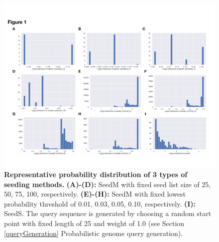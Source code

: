 \documentclass[12pt]{article}
\begin{document}
	\begin{figure}[!htb]
		\centering
		\includegraphics[width=1\textwidth,trim={0.5cm 1cm 0.7cm 3cm},clip]{fig1} %
		\caption{\textbf{Representative probability distribution of 3 types of seeding methods.} \textbf{(A)-(D):} SeedM with fixed seed list size of 25, 50, 75, 100, respectively. \textbf{(E)-(H):} SeedM with fixed lowest probability threshold of 0.01, 0.03, 0.05, 0.10, respectively. \textbf{(I):} SeedS. The query sequence is generated by choosing a random start point with fixed length of 25 and weight of 1.0 (see Section \ref{queryGeneration} Probabilistic genome query generation).}
		\label{fig:seedDistribution}
	\end{figure}
	
\end{document}
